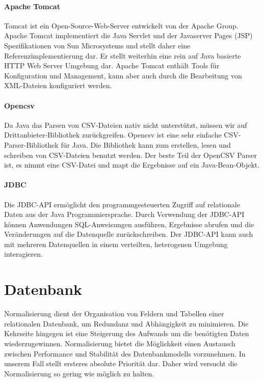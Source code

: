 \paragraph{Apache Tomcat}

Tomcat ist ein Open-Source-Web-Server entwickelt von der Apache Group. Apache Tomcat implementiert die Java Servlet und der Javaserver Pages (JSP) Spezifikationen von Sun Microsystems und stellt daher eine Referenzimplementierung dar. Er stellt weiterhin eine rein auf Java basierte HTTP Web Server Umgebung dar. Apache Tomcat enthält Tools für Konfiguration und Management, kann aber auch durch die Bearbeitung von XML-Dateien konfiguriert werden.

\paragraph{Opencsv}

Da Java das Parsen von CSV-Dateien nativ nicht unterstützt, müssen wir auf Drittanbieter-Bibliothek zurückgreifen. Opencsv ist eine sehr einfache CSV-Parser-Bibliothek für Java. Die Bibliothek kann zum erstellen, lesen und schreiben von CSV-Dateien benutzt werden. Der beste Teil der OpenCSV Parser ist, es nimmt eine CSV-Datei und mapt die Ergebnisse auf ein Java-Bean-Objekt.

\paragraph{JDBC}

Die JDBC-API ermöglicht den programmgesteuerten Zugriff auf relationale Daten aus der Java Programmiersprache. Durch Verwendung der JDBC-API können Anwendungen SQL-Anweisungen ausführen, Ergebnisse abrufen und die Veränderungen auf die Datenquelle zurückschreiben. Der JDBC-API kann auch mit mehreren Datenquellen in einem verteilten, heterogenen Umgebung interagieren. 

\section{Datenbank}

Normalisierung dient der Organisation von Feldern und Tabellen einer relationalen Datenbank, um Redundanz und Abhängigkeit zu minimieren. Die Kehrseite hingegen ist eine Steigerung des Aufwands um die benötigten Daten wiederzugewinnen. Normalisierung bietet die Möglichkeit einen Austausch zwischen Performance und Stabilität des Datenbankmodells vorzunehmen. 
In unserem Fall stellt ersteres absolute Priorität dar. Daher wird versucht die Normalisierung so gering wie möglich zu halten. 

